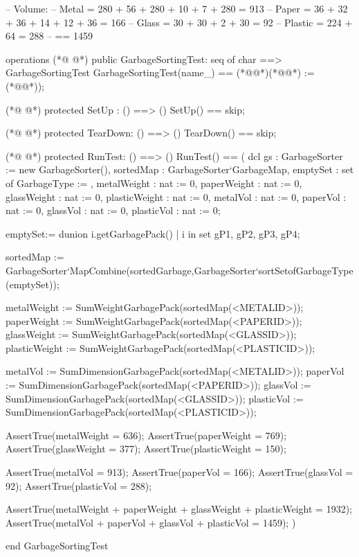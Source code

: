 \begin{vdmpp}[breaklines=true]
-- Volume:
-- Metal = 280 + 56 + 280 + 10 + 7 + 280 = 913
-- Paper = 36 + 32 + 36 + 14 + 12 + 36 = 166
-- Glass = 30 + 30 + 2 + 30 = 92
-- Plastic = 224 + 64 = 288
-- == 1459

operations
(*@
\label{GarbageSortingTest:52}
@*)
    public GarbageSortingTest: seq of char ==> GarbageSortingTest
    GarbageSortingTest(name_) ==
    (*@\vdmnotcovered{(}@*)(*@@*) := (*@@*));

(*@
\label{SetUp:56}
@*)
    protected SetUp : () ==> ()
    SetUp() == skip;

(*@
\label{TearDown:59}
@*)
    protected TearDown: () ==> ()
    TearDown() == skip;

(*@
\label{RunTest:62}
@*)
    protected RunTest: () ==> ()
    RunTest() ==
    (
        dcl gs : GarbageSorter := new GarbageSorter(), 
                sortedMap : GarbageSorter`GarbageMap, 
                emptySet : set of GarbageType := {},
                metalWeight : nat := 0,
                paperWeight : nat := 0,
                glassWeight : nat := 0,
                plasticWeight : nat := 0,
                metalVol : nat := 0,
                paperVol : nat := 0,
                glassVol : nat := 0,
                plasticVol : nat := 0;

        emptySet:= dunion {i.getGarbagePack() | i in set {gP1, gP2, gP3, gP4}};

        sortedMap := GarbageSorter`MapCombine(sortedGarbage,GarbageSorter`sortSetofGarbageType(emptySet));

        metalWeight := SumWeightGarbagePack(sortedMap(<METALID>));
        paperWeight := SumWeightGarbagePack(sortedMap(<PAPERID>));
        glassWeight := SumWeightGarbagePack(sortedMap(<GLASSID>));
        plasticWeight := SumWeightGarbagePack(sortedMap(<PLASTICID>));

        metalVol := SumDimensionGarbagePack(sortedMap(<METALID>));
        paperVol := SumDimensionGarbagePack(sortedMap(<PAPERID>));
        glassVol := SumDimensionGarbagePack(sortedMap(<GLASSID>));
        plasticVol := SumDimensionGarbagePack(sortedMap(<PLASTICID>));

        AssertTrue(metalWeight = 636);
        AssertTrue(paperWeight = 769);
        AssertTrue(glassWeight = 377);
        AssertTrue(plasticWeight = 150);

        AssertTrue(metalVol = 913);
        AssertTrue(paperVol = 166);
        AssertTrue(glassVol = 92);
        AssertTrue(plasticVol = 288);

        AssertTrue(metalWeight + paperWeight + glassWeight + plasticWeight = 1932);
        AssertTrue(metalVol + paperVol + glassVol + plasticVol = 1459);
    )

end GarbageSortingTest
\end{vdmpp}
